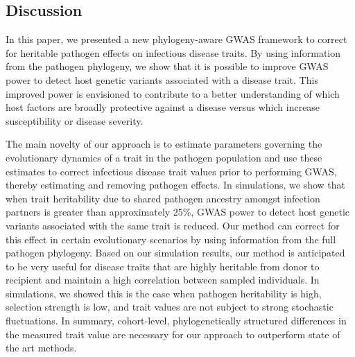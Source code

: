 \documentclass[11pt]{article}
\begin{document}
\begin{linenumbers}
\section*{Discussion}
In this paper, we presented a new phylogeny-aware GWAS framework to correct for heritable pathogen effects on infectious disease traits. By using information from the pathogen phylogeny, we show that it is possible to improve GWAS power to detect host genetic variants associated with a disease trait. This improved power is envisioned to contribute to a better understanding of which host factors are broadly protective against a disease versus which increase susceptibility or disease severity.

The main novelty of our approach is to estimate parameters governing the evolutionary dynamics of a trait in the pathogen population and use these estimates to correct infectious disease trait values prior to performing GWAS, thereby estimating and removing pathogen effects. In simulations, we show that when trait heritability due to shared pathogen ancestry amongst infection partners is greater than approximately 25\%, GWAS power to detect host genetic variants associated with the same trait is reduced. Our method can correct for this effect in certain evolutionary scenarios by using information from the full pathogen phylogeny. Based on our simulation results, our method is anticipated to be very useful for disease traits that are highly heritable from donor to recipient and  maintain a high correlation between sampled individuals. In simulations, we showed this is the case when pathogen heritability is high, selection strength is low, and trait values are not subject to strong stochastic fluctuations. In summary, cohort-level, phylogenetically structured differences in the measured trait value are necessary for our approach to outperform state of the art methods. 


\end{linenumbers}
\end{document}

